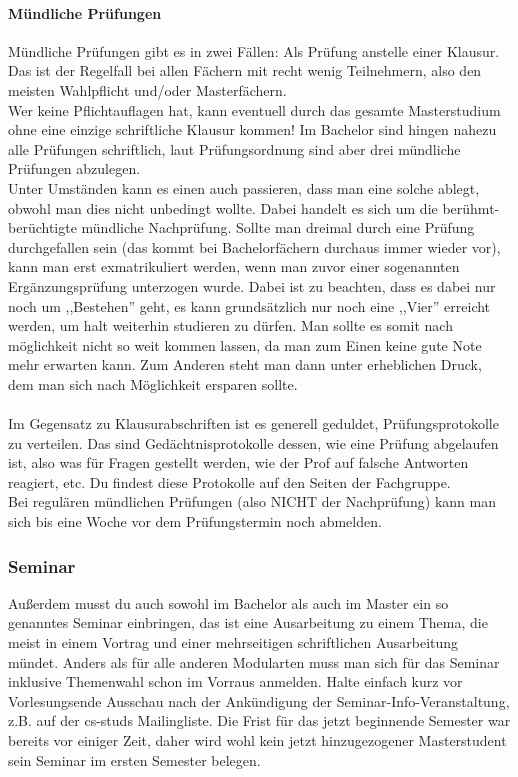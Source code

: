 \paragraph*{Mündliche Prüfungen}
Mündliche Prüfungen gibt es in zwei Fällen: Als Prüfung anstelle einer
Klausur. Das ist der Regelfall bei allen Fächern mit recht wenig
Teilnehmern, also den meisten Wahlpflicht und/oder Masterfächern. \\ 
 Wer keine Pflichtauflagen hat, kann eventuell durch das gesamte
 Masterstudium ohne eine einzige schriftliche Klausur kommen! 
Im Bachelor sind hingen nahezu alle Prüfungen schriftlich, laut
 Prüfungsordnung sind aber drei mündliche Prüfungen abzulegen. \\
Unter Umständen kann es einen auch passieren, dass man eine solche
ablegt, obwohl man dies nicht unbedingt wollte. Dabei handelt es sich
um die berühmt-berüchtigte mündliche Nachprüfung. Sollte man dreimal
durch eine Prüfung durchgefallen sein (das kommt bei Bachelorfächern
durchaus immer wieder vor), kann man erst exmatrikuliert werden, wenn
man zuvor einer sogenannten Ergänzungsprüfung unterzogen wurde. Dabei
ist zu beachten, dass es dabei nur noch um ,,Bestehen'' geht, es kann
grundsätzlich nur noch eine ,,Vier''  erreicht werden, um halt
weiterhin studieren zu dürfen. Man sollte es somit nach möglichkeit
nicht so weit kommen lassen, da man zum Einen keine gute Note mehr
erwarten kann. Zum Anderen steht man dann unter erheblichen Druck, dem
man sich nach Möglichkeit ersparen sollte.\\\\
Im Gegensatz zu Klausurabschriften ist es generell geduldet,
Prüfungsprotokolle zu verteilen. Das sind Gedächtnisprotokolle dessen,
wie eine Prüfung abgelaufen ist, also was für Fragen gestellt werden,
wie der Prof auf falsche Antworten reagiert, etc. Du findest diese
Protokolle auf den Seiten der Fachgruppe.\\
Bei regulären mündlichen Prüfungen (also NICHT der Nachprüfung) kann
man sich bis eine Woche vor dem Prüfungstermin noch abmelden.
\subsubsection{Seminar}
Außerdem musst du auch sowohl im Bachelor als auch im Master ein so genanntes Seminar einbringen, das ist eine Ausarbeitung zu einem Thema, die meist in einem Vortrag und einer mehrseitigen schriftlichen Ausarbeitung mündet. Anders als für alle anderen Modularten muss man sich für das Seminar inklusive Themenwahl schon im Vorraus anmelden. Halte einfach kurz vor Vorlesungsende Ausschau nach der Ankündigung der Seminar-Info-Veranstaltung, z.B. auf der cs-studs Mailingliste. Die Frist für das jetzt beginnende Semester war bereits vor einiger Zeit, daher wird wohl kein jetzt hinzugezogener Masterstudent sein Seminar im ersten Semester belegen.

